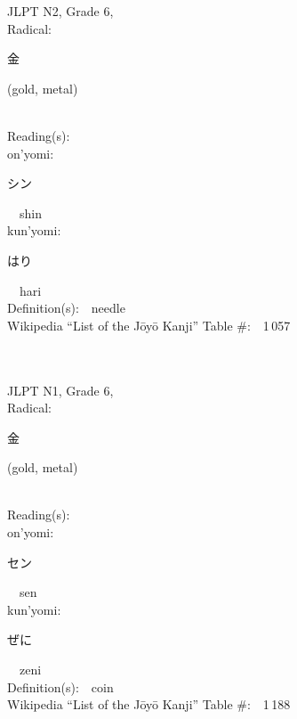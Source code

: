 \begin{multicols}{2}
{JLPT N2, Grade 6, \\Radical:\ \ {\begin{CJK}{UTF8}{min} 金 \end{CJK}} (gold, metal) } \\
Reading(s):\ \ \\
{\hspace*{1em}}on'yomi:\ \ \\
{\hspace*{2em}}{\begin{CJK}{UTF8}{min} シン \end{CJK}}\ \ shin\ \ \\
{\hspace*{1em}}kun'yomi:\ \ \\
{\hspace*{2em}}{\begin{CJK}{UTF8}{min} はり \end{CJK}}\ \ hari\ \ \\
Definition(s):\ \ needle \\
Wikipedia ``List of the J\=oy\=o Kanji'' Table \#:\ \ 1\,057 \\
\ \ \\
{\fontsize{34pt}{40pt}  }\ \ \\  %
{JLPT N1, Grade 6, \\Radical:\ \ {\begin{CJK}{UTF8}{min} 金 \end{CJK}} (gold, metal) } \\
Reading(s):\ \ \\
{\hspace*{1em}}on'yomi:\ \ \\
{\hspace*{2em}}{\begin{CJK}{UTF8}{min} セン \end{CJK}}\ \ sen\ \ \\
{\hspace*{1em}}kun'yomi:\ \ \\
{\hspace*{2em}}{\begin{CJK}{UTF8}{min} ぜに \end{CJK}}\ \ zeni\ \ \\
Definition(s):\ \ coin \\
Wikipedia ``List of the J\=oy\=o Kanji'' Table \#:\ \ 1\,188 \\

\end{multicols}
